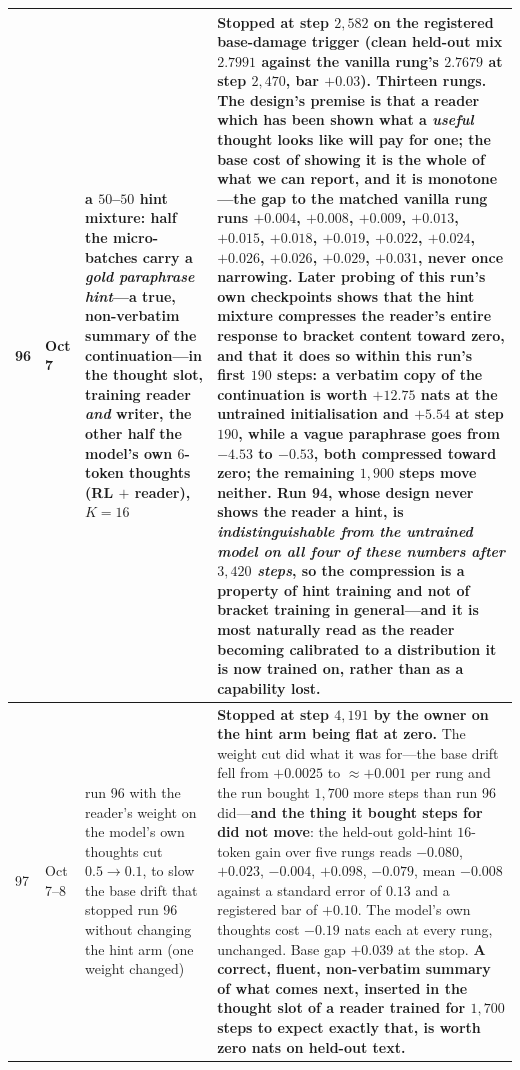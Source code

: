 \documentclass{article} %
\begin{document}
{\begin{longtable}{@{}llp{3.6cm}p{5.6cm}@{}}
96 & Oct 7 & \textbf{a $50$--$50$ hint mixture}: half the micro-batches carry a \emph{gold paraphrase hint}---a true, non-verbatim summary of the continuation---in the thought slot, training reader \emph{and} writer, the other half the model's own $6$-token thoughts (RL ${+}$ reader), $K = 16$ & \textbf{Stopped at step $2{,}582$ on the registered base-damage trigger} (clean held-out mix $2.7991$ against the vanilla rung's $2.7679$ at step $2{,}470$, bar $+0.03$). Thirteen rungs. The design's premise is that a reader which has been shown what a \emph{useful} thought looks like will pay for one; the base cost of showing it is the whole of what we can report, and it is monotone---the gap to the matched vanilla rung runs $+0.004$, $+0.008$, $+0.009$, $+0.013$, $+0.015$, $+0.018$, $+0.019$, $+0.022$, $+0.024$, $+0.026$, $+0.026$, $+0.029$, $+0.031$, never once narrowing. \textbf{Later probing of this run's own checkpoints shows that the hint mixture compresses the reader's entire response to bracket content toward zero, and that it does so within this run's first $190$ steps}: a verbatim copy of the continuation is worth $+12.75$ nats at the untrained initialisation and $+5.54$ at step $190$, while a vague paraphrase goes from $-4.53$ to $-0.53$, both compressed toward zero; the remaining $1{,}900$ steps move neither. Run 94, whose design never shows the reader a hint, is \emph{indistinguishable from the untrained model on all four of these numbers after $3{,}420$ steps}, so the compression is a property of hint training and not of bracket training in general---and it is most naturally read as the reader becoming calibrated to a distribution it is now trained on, rather than as a capability lost. \\
\midrule
97 & Oct 7--8 & run 96 with the reader's weight on the model's own thoughts cut $0.5 \to 0.1$, to slow the base drift that stopped run 96 without changing the hint arm (one weight changed) & \textbf{Stopped at step $4{,}191$ by the owner on the hint arm being flat at zero.} The weight cut did what it was for---the base drift fell from $+0.0025$ to ${\approx}+0.001$ per rung and the run bought $1{,}700$ more steps than run 96 did---\textbf{and the thing it bought steps for did not move}: the held-out gold-hint $16$-token gain over five rungs reads $-0.080$, $+0.023$, $-0.004$, $+0.098$, $-0.079$, mean $-0.008$ against a standard error of $0.13$ and a registered bar of $+0.10$. The model's own thoughts cost $-0.19$ nats each at every rung, unchanged. Base gap $+0.039$ at the stop. \textbf{A correct, fluent, non-verbatim summary of what comes next, inserted in the thought slot of a reader trained for $1{,}700$ steps to expect exactly that, is worth zero nats on held-out text.} \\

\end{longtable}}
\end{document}
